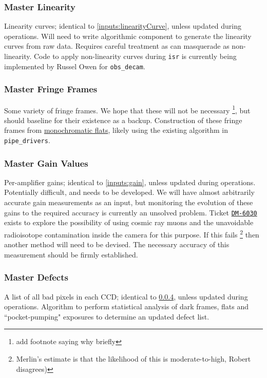 \subsubsection{Master Linearity}\label{calibProducts:linearityCurve}
Linearity curves; identical to \ref{inputs:linearityCurve}, unless updated during operations.
\alg  Will need to write algorithmic component to generate the linearity curves from raw data. Requires careful treatment as \bfeffect can masquerade as non-linearity. Code to apply non-linearity curves during \texttt{isr} is currently being implemented by Russel Owen for \texttt{obs\_decam}.


\subsubsection{Master Fringe Frames}\label{calibProducts:fringeFrames}
Some variety of fringe frames. We hope that these will not be necessary \footnote{\xxx add footnote saying why briefly}, but should baseline for their existence as a backup.
\alg Construction of these fringe frames from \hyperref[inputs:monoFlat]{monochromatic flats}, likely using the existing algorithm in \texttt{pipe\_drivers}.


\subsubsection{Master Gain Values}\label{calibProducts:gains}
Per-amplifier gains; identical to \ref{inputs:gain}, unless updated during operations.
\alg Potentially difficult, and needs to be developed. We will have almost arbitrarily accurate gain measurements as an input, but monitoring the evolution of these gains to the required accuracy is currently an unsolved problem. Ticket \hyperref{https://jira.lsstcorp.org/browse/DM-6030}{}{}{\texttt{DM-6030}} exists to explore the possibility of using cosmic ray muons and the unavoidable radioisotope contamination inside the camera for this purpose. If this fails \footnote{Merlin's estimate is that the likelihood of this is moderate-to-high, Robert disagrees)} then another method will need to be devised. The necessary accuracy of this measurement should be firmly established.


\subsubsection{Master Defects}\label{calibProducts:defectList}
A list of all bad pixels in each CCD; identical to \ref{calibProducts:defectList}, unless updated during operations.
\alg Algorithm to perform statistical analysis of dark frames, flats and ``pocket-pumping" exposures to determine an updated defect list.


